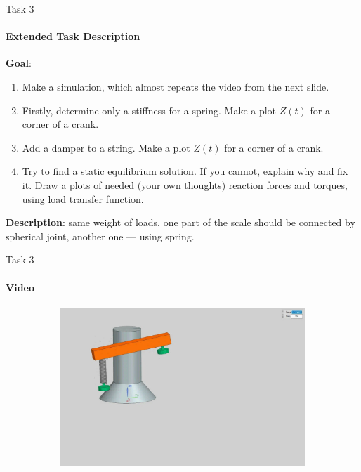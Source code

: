 \documentclass[aspectratio=169]{beamer}
\begin{document}
\begin{frame}[t]{Task 3}
    \framesubtitle{Extended Task Description}
    \textbf{Goal}: \begin{enumerate}
        \item Make a simulation, which almost repeats the video from the next slide.
        \item Firstly, determine only a stiffness for a spring. Make a plot $Z(t)$ for a corner of a crank.
        \item Add a damper to a string. Make a plot $Z(t)$ for a corner of a crank.
        \item Try to find a static equilibrium solution. If you cannot, explain why and fix it. Draw a plots of needed (your own thoughts) reaction forces and torques, using load transfer function.
    \end{enumerate}
    
    
    \smallskip

    \textbf{Description}: same weight of loads, one part of the scale should be connected by spherical joint, another one --- using spring.  
\end{frame}

\begin{frame}[t]{Task 3}
    \framesubtitle{Video}
    \vspace{-0.6cm}
    \begin{figure}[H]
        \href{https://disk.yandex.ru/i/Hw4DpScaAzPctg}{
            \centering\includegraphics[height=6cm,width=1\textwidth,keepaspectratio]{3_preview.png}}
        \label{fig:3_preview.png}
    \end{figure}
\end{frame}
\end{document}
